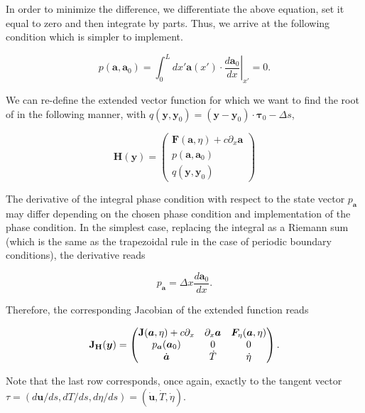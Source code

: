 In order to minimize the difference, we differentiate the above equation, set it equal to zero and 
then integrate by parts. Thus, we arrive at the following condition which is simpler to
implement.

\begin{equation}
    p(\bm{a}, \bm{a}_0) = \int_0^L dx' \bm{a}(x') \cdot \left. \frac{d\bm{a}_0}{dx}\right\vert_{x'} = 0.
\end{equation}

We can re-define the extended vector function for which we want to find 
the root of in the following manner, with $q(\bm{y}, \bm{y}_0) = (\bm{y} - \bm{y}_0) \cdot \bm{\tau}_0 - \Delta s $,

\begin{equation}
    \bm{H(\bm{y})} = \begin{pmatrix}
      \bm{F}(\bm{a}, \eta) + c\partial_x\bm{a} \\
    p(\bm{a}, \bm{a}_0) \\
    q(\bm{y}, \bm{y}_0)
    \end{pmatrix}
\end{equation}


The derivative of the integral phase condition with respect to the state vector $p_{\bm{a}}$ may differ depending on the chosen 
phase condition and implementation of the phase condition. In the simplest case, 
replacing the integral as a Riemann sum (which is the same as the trapezoidal rule in the case of periodic boundary conditions), the derivative reads

\begin{equation}
    p_{\bm{a}} = \Delta x \dfrac{d\bm{a}_0}{dx}.
\end{equation}

Therefore, the corresponding Jacobian of the extended function reads

\begin{equation}
    \mathbf{J_H}(\bm{y}) = \begin{pmatrix}
        \mathbf{J}(\bm{a}, \eta) + c\partial_x & \partial_x\bm{a} &  \bm{F}_\eta(\bm{a}, \eta)\\
        p_{\bm{a}}(\bm{a}_0) & 0 & 0 \\
        \dot{\bm{a}} & \dot{T} & \dot{\eta} \\
    \end{pmatrix}.
\end{equation}

Note that the last row corresponds, once again, exactly to the tangent vector
$\tau = (d\bm{u}/ds, dT/ds, d\eta/ds) = (\dot{\bm{u}}, \dot{T}, \dot{\eta})$.



